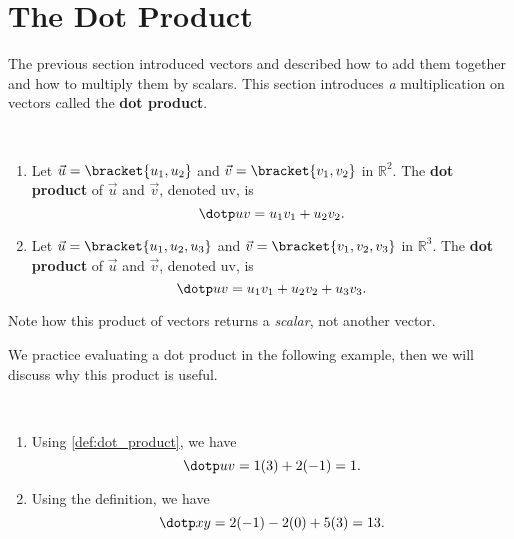 \section{The Dot Product}\label{sec:dot_product}

The previous section introduced vectors and described how to add them together and how to multiply them by scalars. This section introduces \emph{a} multiplication on vectors called the \textbf{dot product}.

\begin{definition}\label{def:dot_product}
\mbox{}\\[-2\baselineskip]\begin{enumerate}
	\item Let $\vec u =\bracket{u_1,u_2}$ and $\vec v = \bracket{v_1,v_2}$  in $\mathbb{R}^2$. The \textbf{dot product} of $\vec u$ and $\vec v$, denoted \dotp uv, is 
	\[\dotp uv = u_1v_1+u_2v_2.\]
	\item Let $\vec u = \bracket{u_1,u_2,u_3}$ and $\vec v = \bracket{v_1,v_2,v_3}$  in $\mathbb{R}^3$. The \textbf{dot product} of $\vec u$ and $\vec v$, denoted \dotp uv, is 
	\[\dotp uv = u_1v_1+u_2v_2+u_3v_3.\]
\end{enumerate}
\end{definition}

Note how this product of vectors returns a \emph{scalar}, not another vector.

We practice evaluating a dot product in the following example, then we will discuss why this product is useful.

{\mbox{}\\[-\baselineskip]\begin{enumerate}
	\item Using \autoref{def:dot_product}, we have
	\[\dotp uv = 1(3)+2(-1) = 1.\]
	\item	Using the definition, we have
	\[\dotp xy = 2(-1)  -2(0) + 5(3) = 13.\]
\end{enumerate}}

